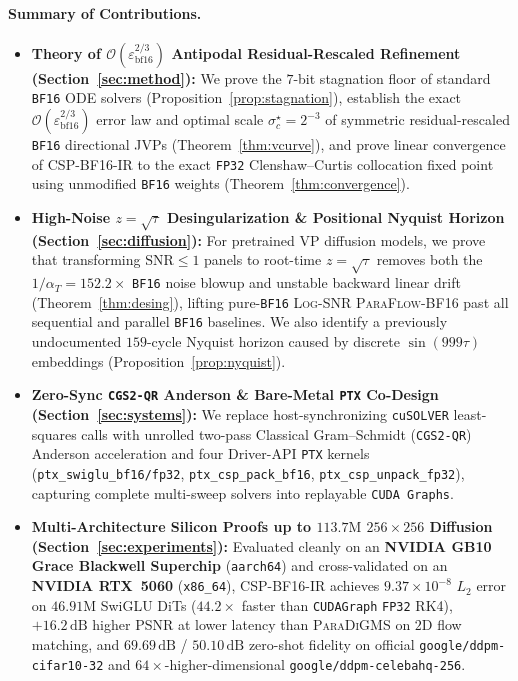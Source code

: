 \documentclass[11pt,a4paper]{article}
\theoremstyle{definition}
\theoremstyle{remark}
\newcommand{\bfsixteen}{\texttt{BF16}}
\newcommand{\fpthirtytwo}{\texttt{FP32}}
\newcommand{\epsbf}{\varepsilon_{\mathrm{bf16}}}
\begin{document}
\paragraph{Summary of Contributions.}
\begin{itemize}[leftmargin=1.8em,itemsep=2pt]
    \item \textbf{Theory of $\mathcal{O}(\epsbf^{2/3})$ Antipodal Residual-Rescaled Refinement (Section~\ref{sec:method}):} We prove the $7$-bit stagnation floor of standard \bfsixteen{} ODE solvers (Proposition~\ref{prop:stagnation}), establish the exact $\mathcal{O}(\epsbf^{2/3})$ error law and optimal scale $\sigma_c^\star = 2^{-3}$ of symmetric residual-rescaled \bfsixteen{} directional JVPs (Theorem~\ref{thm:vcurve}), and prove linear convergence of \textsc{CSP-BF16-IR} to the exact \fpthirtytwo{} Clenshaw--Curtis collocation fixed point using unmodified \bfsixteen{} weights (Theorem~\ref{thm:convergence}).
    \item \textbf{High-Noise $z=\sqrt{\tau}$ Desingularization \& Positional Nyquist Horizon (Section~\ref{sec:diffusion}):} For pretrained VP diffusion models, we prove that transforming $\mathrm{SNR}\le 1$ panels to root-time $z=\sqrt{\tau}$ removes both the $1/\alpha_T = 152.2\times$ \bfsixteen{} noise blowup and unstable backward linear drift (Theorem~\ref{thm:desing}), lifting pure-\bfsixteen{} \textsc{Log-SNR ParaFlow-BF16} past all sequential and parallel \bfsixteen{} baselines. We also identify a previously undocumented $159$-cycle Nyquist horizon caused by discrete $\sin(999\tau)$ embeddings \citep{ho2020denoising} (Proposition~\ref{prop:nyquist}).
    \item \textbf{Zero-Sync \texttt{CGS2-QR} Anderson \& Bare-Metal \texttt{PTX} Co-Design (Section~\ref{sec:systems}):} We replace host-synchronizing \texttt{cuSOLVER} least-squares calls with unrolled two-pass Classical Gram--Schmidt (\texttt{CGS2-QR}) Anderson acceleration and four Driver-API \texttt{PTX} kernels (\texttt{ptx\_swiglu\_bf16/fp32}, \texttt{ptx\_csp\_pack\_bf16}, \texttt{ptx\_csp\_unpack\_fp32}), capturing complete multi-sweep solvers into replayable \texttt{CUDA Graphs}.
    \item \textbf{Multi-Architecture Silicon Proofs up to $113.7\text{M}$ $256\times 256$ Diffusion (Section~\ref{sec:experiments}):} Evaluated cleanly on an \textbf{NVIDIA GB10 Grace Blackwell Superchip} (\texttt{aarch64}) and cross-validated on an \textbf{NVIDIA RTX~5060} (\texttt{x86\_64}), \textsc{CSP-BF16-IR} achieves $9.37 \times 10^{-8}$ $L_2$ error on $46.91\text{M}$ SwiGLU DiTs ($44.2\times$ faster than \texttt{CUDAGraph} \fpthirtytwo{} RK4), $+16.2\,\mathrm{dB}$ higher PSNR at lower latency than \textsc{ParaDiGMS} on $2\text{D}$ flow matching, and \textbf{$69.69\,\mathrm{dB}$} / \textbf{$50.10\,\mathrm{dB}$} zero-shot fidelity on official \texttt{google/ddpm-cifar10-32} and $64\times$-higher-dimensional \texttt{google/ddpm-celebahq-256}.
\end{itemize}
\end{document}
